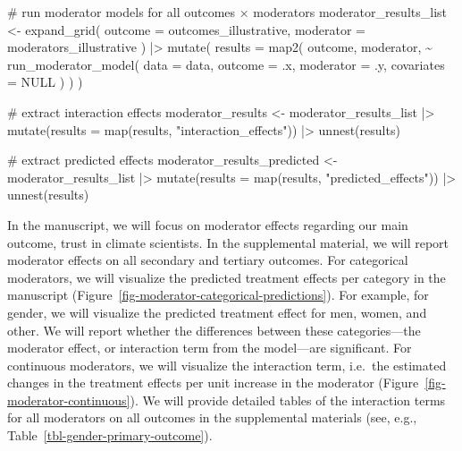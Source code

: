 \documentclass[
  letterpaper,
  DIV=11,
  numbers=noendperiod]{scrartcl}
\newenvironment{Shaded}{\begin{snugshade}}{\end{snugshade}}
\newcommand{\AttributeTok}[1]{\textcolor[rgb]{0.40,0.45,0.13}{#1}}
\newcommand{\CommentTok}[1]{\textcolor[rgb]{0.37,0.37,0.37}{#1}}
\newcommand{\ConstantTok}[1]{\textcolor[rgb]{0.56,0.35,0.01}{#1}}
\newcommand{\FunctionTok}[1]{\textcolor[rgb]{0.28,0.35,0.67}{#1}}
\newcommand{\NormalTok}[1]{\textcolor[rgb]{0.00,0.23,0.31}{#1}}
\newcommand{\OtherTok}[1]{\textcolor[rgb]{0.00,0.23,0.31}{#1}}
\newcommand{\SpecialCharTok}[1]{\textcolor[rgb]{0.37,0.37,0.37}{#1}}
\newcommand{\StringTok}[1]{\textcolor[rgb]{0.13,0.47,0.30}{#1}}
\begin{document}
\begin{Shaded}
\begin{Highlighting}[]
\CommentTok{\# run moderator models for all outcomes × moderators}
\NormalTok{moderator\_results\_list }\OtherTok{\textless{}{-}} \FunctionTok{expand\_grid}\NormalTok{(}
  \AttributeTok{outcome   =}\NormalTok{ outcomes\_illustrative,}
  \AttributeTok{moderator =}\NormalTok{ moderators\_illustrative}
\NormalTok{) }\SpecialCharTok{|\textgreater{}}
  \FunctionTok{mutate}\NormalTok{(}
    \AttributeTok{results =} \FunctionTok{map2}\NormalTok{(}
\NormalTok{      outcome, moderator,}
      \SpecialCharTok{\textasciitilde{}} \FunctionTok{run\_moderator\_model}\NormalTok{(}
          \AttributeTok{data       =}\NormalTok{ data,}
          \AttributeTok{outcome    =}\NormalTok{ .x,}
          \AttributeTok{moderator  =}\NormalTok{ .y,}
          \AttributeTok{covariates =} \ConstantTok{NULL}
\NormalTok{        )}
\NormalTok{    )}
\NormalTok{  )}

\CommentTok{\# extract interaction effects}
\NormalTok{moderator\_results }\OtherTok{\textless{}{-}}\NormalTok{ moderator\_results\_list }\SpecialCharTok{|\textgreater{}}
  \FunctionTok{mutate}\NormalTok{(}\AttributeTok{results =} \FunctionTok{map}\NormalTok{(results, }\StringTok{"interaction\_effects"}\NormalTok{)) }\SpecialCharTok{|\textgreater{}}
  \FunctionTok{unnest}\NormalTok{(results)}

\CommentTok{\# extract predicted effects}
\NormalTok{moderator\_results\_predicted }\OtherTok{\textless{}{-}}\NormalTok{ moderator\_results\_list }\SpecialCharTok{|\textgreater{}}
  \FunctionTok{mutate}\NormalTok{(}\AttributeTok{results =} \FunctionTok{map}\NormalTok{(results, }\StringTok{"predicted\_effects"}\NormalTok{)) }\SpecialCharTok{|\textgreater{}}
  \FunctionTok{unnest}\NormalTok{(results)}
\end{Highlighting}
\end{Shaded}

In the manuscript, we will focus on moderator effects regarding our main
outcome, trust in climate scientists. In the supplemental material, we
will report moderator effects on all secondary and tertiary outcomes.
For categorical moderators, we will visualize the predicted treatment
effects per category in the manuscript
(Figure~\ref{fig-moderator-categorical-predictions}). For example, for
gender, we will visualize the predicted treatment effect for men, women,
and other. We will report whether the differences between these
categories---the moderator effect, or interaction term from the
model---are significant. For continuous moderators, we will visualize
the interaction term, i.e.~the estimated changes in the treatment
effects per unit increase in the moderator
(Figure~\ref{fig-moderator-continuous}). We will provide detailed tables
of the interaction terms for all moderators on all outcomes in the
supplemental materials (see, e.g.,
Table~\ref{tbl-gender-primary-outcome}).
\end{document}
